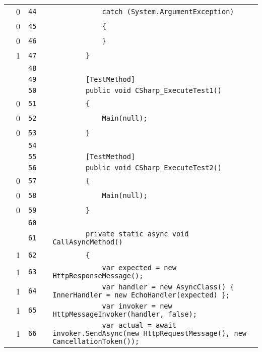 \documentclass[a4paper,landscape,10pt]{article}
\begin{document}
\begin{longtable}[l]{lrrll}
\cellcolor{red} & 0 & \verb~44~ & & \verb~            catch (System.ArgumentException)~\\
\cellcolor{red} & 0 & \verb~45~ & & \verb~            {~\\
\cellcolor{red} & 0 & \verb~46~ & & \verb~            }~\\
\cellcolor{green} & 1 & \verb~47~ & & \verb~        }~\\
\cellcolor{gray} &  & \verb~48~ & & \verb~~\\
\cellcolor{gray} &  & \verb~49~ & & \verb~        [TestMethod]~\\
\cellcolor{gray} &  & \verb~50~ & & \verb~        public void CSharp_ExecuteTest1()~\\
\cellcolor{red} & 0 & \verb~51~ & & \verb~        {~\\
\cellcolor{red} & 0 & \verb~52~ & & \verb~            Main(null);~\\
\cellcolor{red} & 0 & \verb~53~ & & \verb~        }~\\
\cellcolor{gray} &  & \verb~54~ & & \verb~~\\
\cellcolor{gray} &  & \verb~55~ & & \verb~        [TestMethod]~\\
\cellcolor{gray} &  & \verb~56~ & & \verb~        public void CSharp_ExecuteTest2()~\\
\cellcolor{red} & 0 & \verb~57~ & & \verb~        {~\\
\cellcolor{red} & 0 & \verb~58~ & & \verb~            Main(null);~\\
\cellcolor{red} & 0 & \verb~59~ & & \verb~        }~\\
\cellcolor{gray} &  & \verb~60~ & & \verb~~\\
\cellcolor{gray} &  & \verb~61~ & & \verb~        private static async void CallAsyncMethod()~\\
\cellcolor{green} & 1 & \verb~62~ & & \verb~        {~\\
\cellcolor{green} & 1 & \verb~63~ & & \verb~            var expected = new HttpResponseMessage();~\\
\cellcolor{green} & 1 & \verb~64~ & & \verb~            var handler = new AsyncClass() { InnerHandler = new EchoHandler(expected) };~\\
\cellcolor{green} & 1 & \verb~65~ & & \verb~            var invoker = new HttpMessageInvoker(handler, false);~\\
\cellcolor{green} & 1 & \verb~66~ & & \verb~            var actual = await invoker.SendAsync(new HttpRequestMessage(), new CancellationToken());~\\

\end{longtable}
\end{document}
